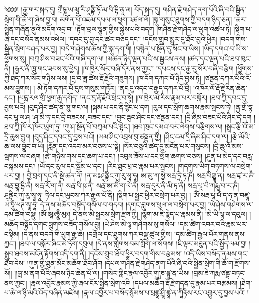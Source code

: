 ༄༅༅། །རྒྱ་གར་སྐད་དུ། ཀྲྀཥྞ་ཡ་མཱ་རི་ཤཱནྟི་ཧོ་མ་བི་དྷི་ནཱ་མ། བོད་སྐད་དུ། གཤིན་རྗེ་གཤེད་ནག་པོའི་ཞི་བའི་སྦྱིན་སྲེག་གི་ཆོ་ག་ཞེས་བྱ་བ། མགོན་པོ་འཇམ་དཔལ་ལ་ཕྱག་འཚལ་ལོ། །སྐུ་གསུང་ཐུགས་ཀྱི་བདག་ཉིད་ཅན། །ཆར་སྤྲིན་གཞོན་ནུའི་མདོག་འདྲ་བ། །རྟོག་བྲལ་ལྷུན་གྱིས་སྐྱེས་པའི་བདག །གཤིན་རྗེ་གཤེད་ལ་ཕྱག་འཚལ་ཏེ། །སྡིག་པ་ཞི་དང་བསོད་ནམས་འཕེལ། །དབང་དུ་བྱ་དང་ཚར་བཅད་དང་། །དངོས་གྲུབ་མྱུར་དུ་ཐོབ་བྱའི་ཕྱིར། །བདག་གིས་སྦྱིན་སྲེག་བཤད་པར་བྱ། །བདེ་གཤེགས་ཆོས་ཀྱི་སྐུ་དག་གི། །བསྙེན་པ་སྔོན་དུ་སོང་བ་ཡིས། །ཡིད་དགའ་བ་ཡི་ས་ཕྱོགས་སུ། །བཀྲ་ཤིས་བཟང་པོའི་གཞི་དག་ལ། །མཚན་ཉིད་ལྡན་པའི་ས་སྦྱངས་ནས། །ཚད་དང་ལྡན་པའི་ཐབ་ཁུང་ནི། །རྒྱར་ནི་ཁྲུ་གང་ཟབས་སུ་ཕྱེད། །ཁ་ཁྱེར་སོར་བཞི་དོར་ནས་ཀྱང་། །དཔངས་དང་རྒྱ་རུ་སོར་བཞི་བརྩིག །ཕྱོགས་ཀྱི་ཐད་ཀར་སོར་གཉིས་ལས། །དྲ་བ་ཟླ་ཚེས་རྡོ་རྗེའི་གཟུགས། །ཁ་དོག་དཀར་པོ་ཉིད་བྱས་ཏེ། །ཙནྡན་དཀར་པོའི་འོ་མས་བྱུགས། ། མེ་ཏོག་དཀར་པོ་དུས་གསུམ་གཏོར། །ནང་དུ་འདབ་བརྒྱད་དཀར་པོ་བྲི། །འཁོར་ལོ་རྡོ་རྗེ་རིན་ཆེན་དང་། །པདྨ་རལ་གྲི་ཕྱག་རྒྱ་དགོད། །ནང་དུ་རྡོ་རྗེའི་ཕྲེང་བ་སྟེ། །ཁ་ཁྱེར་མེ་རིས་རྣམ་པར་བསྐོར། །ཐབ་ཀྱི་དབང་དུ་བྱས་པའོ། །བུད་ཤིང་ཚད་ནི་ཁྲུ་གང་ལ། །སྐམ་པ་དང་ནི་རྙིང་པ་དག །རུལ་དང་སྲོག་ཆགས་རྣམ་སྤངས་ཏེ། །ནྱ་གྲོ་དྷ་དང་པཱ་ལ་ཤ །ཤ་མི་ཏ་དང་དྲི་{བཟངས་,བཟང་}དང་། །བྱང་ཆུབ་ཤིང་དང་ཙནྡན་དང་། །དྲི་ཞིམ་བཟང་པོའི་ཤིང་དེ་དག །ཐབ་ཀྱི་ཁོ་ར་ཁོར་ཡུག་ཏུ། །ཀུ་ཤ་སྔོན་པོ་བཀྲམ་པའི་སྟེང་། །ཐབ་ཁུང་དམའ་བར་ལེགས་བརྩིགས་ལ། །སྦྲང་རྩི་འོ་མ་དྲི་ཆུས་བྱུག །བུད་ཤིང་དབང་དུ་བྱས་པའོ། །ཡམ་ཤིང་འབྲས་བུ་ཙནྡན་གྱི། །ཤིང་ངམ་དྲི་ཞིམ་ཤིང་དག་ལ། །རྩེ་མོའི་ཆ་ལས་བྱུང་བ་ཡི། །རློན་དང་འདབ་མར་བཅས་པ་སྟེ། །སོར་བཅུའི་ཚད་དུ་མངོན་པར་གསུངས། །དྲི་ཆུ་འོ་མས་སྦགས་ལ་བཞག །རྩེ་གཉིས་གས་དང་ཆག་པ་དང་། །འབུས་ཟོས་པ་དང་སྲོག་ཆགས་བཅས། །ཤུན་པ་མེད་དང་བརླ་བསྐམས་དང་། །ཡོ་དང་རུལ་དང་སྦོམ་པ་དང་། །རིང་ཐུང་ཕྲ་བ་རྣམ་པར་སྤངས། །གདགས་ཡིག་བཏགས་ལ་བསྲེག་པར་བྱ། ། བྱེ་བྲག་དང་ནི་སྡེ་ཚན་ནོ། །ན་མཿཤཱནྟིང་ཀུ་རུ་སྭཱ་ཧཱ། ཨ་མུ་ཀ་སྱེ་སརྦ་ཏྲེ་ཧ་ཎྃ། སརྦ་བིགྷྣཱ་ན། སརྦ་ཛྭ་ར་ཎྃ། སརྦ་བྱཱ་དྷི་ནྃ། སརྦ་རོ་ག་ནྃ། སརྦ་བི་ཥ་ནྃ། སརྦ་ཨ་མྃ་ག་ལེ་ནྃ། སརྦ་དུར་ནི་མི་ཏ་ནྃ། སརྦ་པཱ་པྃ་ཀརྨཱ་བ་ར་ཎྃ། ཤཱནྟིང་ཀུ་རུ་སྭཱ་ཧཱ། ཏིལ་དང་ཡུངས་ཀར་རྒྱལ་པོ་ནི། །སྡིག་པ་སྦྱང་ཕྱིར་བསྲེག་པར་བྱ། །
ཨོཾ་སརྦ་པཱ་པྃ་ད་ཧ་ན་བཛྲཱ་ཡ་ཧཱུྃ་ཕཊ་སྭཱ་ཧཱ། དེ་ནས་མཆོད་བསྟོད་གསོལ་བ་གདབ། །དགང་བླུགས་ཕུལ་ལ་བསྲེག་པར་བྱ། །ཡེ་ཤེས་གཤེགས་ལ་དམ་ཚིག་བསྡུ། །ཨོཾ་ཨཱཿཧཱུྃ་མུཿ། དེ་ནས་མེ་སྦྱངས་སྲེག་རྫས་ཀྱི། །ལྷག་མ་ཇི་སྙེད་པ་རྣམས་ནི། །མེ་ཡི་ལྷ་ལ་དབུལ། །མཆོད་བསྟོད་དགང་བླུགས་བཟོད་གསོལ་བྱ། །ཡེ་ཤེས་མེ་ལྷ་གཤེགས་སུ་གསོལ། །དམ་ཚིག་འབར་བའི་རྣམ་པར་བསྟིམ། །དེ་ནས་བདག་གི་ཕྱག་རྒྱ་ཆེ། །དགྲོལ་དང་ཐུགས་ཀར་བསྡུ་ཚུལ་གྱིས། །དམ་ཚིག་རྒྱལ་པོར་གནས་ནས་ཀྱང་། །ཐབ་ལ་བསྐོར་ཞིང་མེ་ཏོག་དབུལ། །དེ་ནས་གླེགས་བམ་ཀློག་ལ་སོགས། །ཇི་ལྟར་མཐུན་པའི་སྤྱོད་ལམ་བྱ། །སྒྲུབ་ཐབས་མངོན་རྟོགས་འདི་དག་ནི། །དངོས་གྲུབ་ཐོབ་ཕྱིར་བདག་གིས་བརྩམས། །འདི་ཡིས་བསོད་ནམས་གང་ཐོབ་དེས། །ཀུན་གྱི་ཐུན་མོང་མཆོག་ཐོབ་ཤོག །དཔལ་གཤིན་རྗེ་གཤེད་ནག་པོའི་ཞི་བའི་སྦྱིན་སྲེག་གི་ཆོ་ག་རྫོགས་སོ།། །།བླ་མ་ནག་པོའི་ཞབས་ཉིད་ཆེན་པོ་ལ། །གསེར་གླིང་རྣལ་འབྱོར་གུ་ཎ་ཛྙཱ་ན་ཡིས། །བྲམ་ཟེ་ཀརྨ་ཙནྡྲ་བཏང་ནས་ཀྱང་། །རྣལ་འབྱོར་རྣམས་ཀྱི་ཞལ་ངོར་སྦྱིན་སྲེག་འདི། །དཔལ་མཆོག་རྡོ་རྗེ་གདན་དུ་རྣམ་པར་བརྩམས། །ཐེག་པ་ཆེ་ལ་ཉི་མའི་འོད་བཞིན་མཛེས། །རྣལ་འབྱོར་པ་བསོད་སྙོམས་པ་པྲཛྙཱ་ཤྲཱི་ཛྙཱ་ན་ཀཱིརྟིས་རང་འགྱུར་དུ་བྱས་པའོ། །